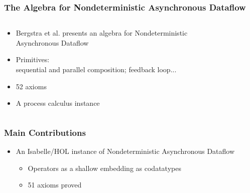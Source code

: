 \documentclass[fleqn,aspectratio=169,10pt]{beamer}
\begin{document}
\begin{frame}[fragile]
  \frametitle{The Algebra for Nondeterministic Asynchronous Dataflow}
  \begin{columns}
    \begin{column}{.6\textwidth}
      \begin{itemize}
        \item Bergstra et al. presents an algebra for Nondeterministic Asynchronous Dataflow
        \item Primitives:\\
              sequential and parallel composition; feedback loop...
        \item 52 axioms
        \item A process calculus instance
      \end{itemize}
    \end{column}
    \begin{column}{.4\textwidth}
      \begin{figure}
        \centering
      \end{figure}
    \end{column}
  \end{columns}
\end{frame}

\begin{frame}[fragile]
  \frametitle{Main Contributions}
  \begin{itemize}
    \item An Isabelle/HOL instance of Nondeterministic Asynchronous Dataflow
          \begin{itemize}
            \item Operators as a shallow embedding as codatatypes
            \item 51 axioms proved
          \end{itemize}
  \end{itemize}
\end{frame}
\end{document}
